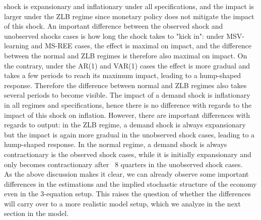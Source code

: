 \documentclass[12pt,reqno]{article}
\numberwithin{equation}{section}
\begin{document}
shock is expansionary and inflationary under all specifications, and the impact is larger under the ZLB regime since monetary policy does not mitigate the impact of this shock. An important difference between the observed shock and unobserved shocks cases is how long the shock takes to "kick in": under MSV-learning and MS-REE cases, the effect is maximal on impact, and the difference between the normal and ZLB regimes is therefore also maximal on impact. On the contrary, under the AR(1) and VAR(1) cases the effect is more gradual and takes a few periods to reach its maximum impact, leading to a hump-shaped response. Therefore the difference between normal and ZLB regimes also takes several periods to become visible. The impact of a demand shock is inflationary in all regimes and specifications, hence there is no difference with regards to the impact of this shock on inflation. However, there are important differences with regards to output: in the ZLB regime, a demand shock is always expansionary but the impact is again more gradual in the unobserved shock cases, leading to a hump-shaped response. In the normal regime, a demand shock is always contractionary is the observed shock cases, while it is initially expansionary and only becomes contractionary after ~8 quarters in the unobserved shock cases. \\
\noindent
As the above discussion makes it clear, we can already observe some important differences in the estimations and the implied stochastic structure of the economy even in the 3-equation setup. This raises the question of whether the differences will carry over to a more realistic model setup, which we analyze in the next section in the \cite{smets2007shocks} model. 
\end{document}
